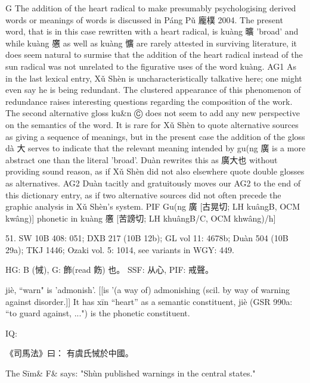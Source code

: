 G The addition of the heart radical to make presumably psychologising derived words or meanings of words is discussed in Páng Pǔ 龐樸 2004. The present word, that is in this case rewritten with a heart radical, is kuàng 曠 'broad' and while kuàng 懬 as well as kuàng 懭 are rarely attested in surviving literature, it does seem natural to surmise that the addition of the heart radical instead of the sun radical was not unrelated to the figurative uses of the word kuàng.
AG1 As in the last lexical entry, Xǔ Shèn is uncharacteristically talkative here; one might even say he is being redundant. The clustered appearance of this phenomenon of redundance raises interesting questions regarding the composition of the work. The second alternative gloss ku&n Ⓒ does not seem to add any new perspective on the semantics of the word.
    It is rare for Xǔ Shèn to quote alternative sources as giving a sequence of meanings, but in the present case the addition of the gloss dà 大 serves to indicate that the relevant meaning intended by gu(ng 廣 is a more abstract one than the literal 'broad'.
    Duàn rewrites this as 廣大也 without providing sound reason, as if Xǔ Shèn did not also elsewhere quote double glosses as alternatives.
AG2 Duàn tacitly and gratuitously moves our AG2 to the end of this dictionary entry, as if two alternative sources did not often precede the graphic analysis in Xǔ Shèn's system.
PIF Gu(ng 廣 [古晃切; LH kuângB, OCM kwâng)] phonetic in kuàng 懬 [苦謗切; LH khuângB/C, OCM khwâng)/h]



51. SW 10B 408: 051; DXB 217 (10B 12b); GL vol 11: 4678b; Duàn 504 (10B 29a); TKJ 1446; Ozaki vol. 5: 1014, see
variants in WGY: 449.

HG: B (悈),
G:	飾(read 飭) 也。
SSF: 从心,
PIF: 戒聲。


jiè, ``warn"
is 'admonish'. [[is '(a way of) admonishing (scil. by way of warning against disorder.]]
It has xīn ``heart'' as a semantic constituent,
jiè (GSR 990a: ``to guard against, ...") is the phonetic constituent.

IQ:

《司馬法》曰： 有虞氏悈於中國。

The Sīm& F& says:
"Shùn published warnings in the central states."

